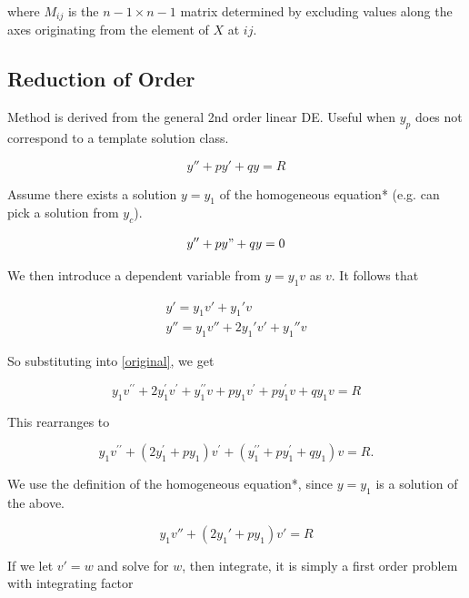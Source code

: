 where $M_{ij}$ is the $n-1\times n-1$ matrix determined by excluding values along the axes originating from the element of $X$ at $ij$.

\subsection{Reduction of Order}

Method is derived from the general 2nd order linear DE. Useful when $y_p$ does not correspond to a template solution class.

\begin{equation*}
    y''+py'+qy=R\label{original}
\end{equation*}

Assume there exists a solution $y=y_1$ of the homogeneous equation* (e.g. can pick a solution from $y_c$).

\begin{eqnarray}
    y''+py"+qy=0
\end{eqnarray}

We then introduce a dependent variable from $y=y_1v$ as $v$. It follows that

\begin{eqnarray}
    y'=y_1v'+y_1'v\\
    y''=y_1v''+2y_1'v'+y_1''v
\end{eqnarray}

So substituting into \ref{original}, we get

\begin{equation*}
    y_{1} v^{\prime \prime}+2 y_{1}^{\prime} v^{\prime}+y_{1}^{\prime \prime} v+p y_{1} v^{\prime}+p y_{1}^{\prime} v+q y_{1} v=R
\end{equation*}

This rearranges to

\begin{equation*}
    y_{1} v^{\prime \prime}+\left(2 y_{1}^{\prime}+p y_{1}\right) v^{\prime}+\left(y_{1}^{\prime \prime}+p y_{1}^{\prime}+q y_{1}\right) v=R .
\end{equation*}

We use the definition of the homogeneous equation*, since $y=y_1$ is a solution of the above.

\begin{equation*}
    y_1v''+(2y_1'+py_1)v'=R
\end{equation*}

If we let $v'=w$ and solve for $w$, then integrate, it is simply a first order problem with integrating factor


